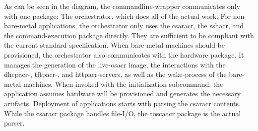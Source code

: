 As can be seen in the diagram, the commandline-wrapper communicates only with one package: The orchestrator, which does all of the actual work. For non-bare-metal applications, the orchestrator only uses the \gls{csaracr}, the \gls{sshacr}, and the command-execution package directly. They are sufficient to be compliant with the current standard specification. When bare-metal machines should be provisioned, the orchestrator also communicates with the hardware package. It manages the generation of the live-\gls{osacr} image, the interactions with the \gls{dhcpacr}-, \gls{tftpacr}-, and \gls{httpacr}-servers, as well as the wake-process of the bare-metal machines.
\newline
When invoked with the initialization subcommand, the application assumes hardware will be provisioned and generates the necessary artifacts.
\newline
Deployment of applications starts with parsing the \gls{csaracr} contents. While the \gls{csaracr} package handles file-I/O, the \gls{toscaacr} package is the actual parser.

